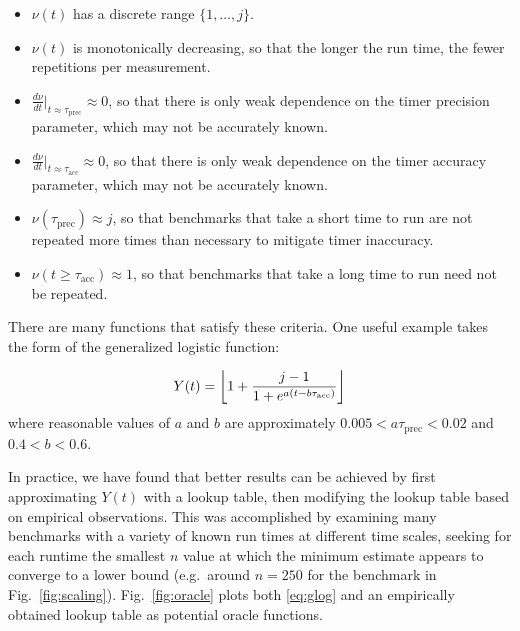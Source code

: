 \documentclass[conference]{IEEEtran}
\DeclarePairedDelimiter\floor{\lfloor}{\rfloor}
\begin{document}
\begin{itemize}
    \item $\nu(t)$ has a discrete range $\{1, \dots, j\}$.
    \item $\nu(t)$ is monotonically decreasing, so that the longer the run time, the fewer repetitions per measurement.
    \item $\frac{d\nu}{dt}|_{t \approx \tau_{\textrm{prec}}} \approx 0$,
    so that there is only weak dependence on the timer precision parameter,
    which may not be accurately known.
    \item $\frac{d\nu}{dt}|_{t \approx \tau_{\textrm{acc}}} \approx 0$,
    so that there is only weak dependence on the timer accuracy parameter,
    which may not be accurately known.
    \item $\nu(\tau_{\textrm{prec}}) \approx j$, so that benchmarks that take a     short time to run are not repeated more times than necessary to mitigate timer inaccuracy.
    \item $\nu(t \ge \tau_{\textrm{acc}}) \approx 1$, so that benchmarks that take a long time to run need not be repeated.
\end{itemize}

There are many functions that satisfy these criteria. One useful example takes
the form of the generalized logistic function:

\begin{equation}
\label{eq:glog}
    Y(t) = \floor*{1 + \frac{j - 1}{1 + e^{a (t - b \tau_{\textrm{acc}})}}}
\end{equation}
%
where reasonable values of $a$ and $b$ are approximately $0.005 < a \tau_{\textrm{prec}} < 0.02$ and $0.4 < b <
0.6$.

In practice, we have found that better results can be achieved by first
approximating $Y(t)$ with a lookup table, then modifying the lookup table based
on empirical observations. This was accomplished by examining many benchmarks
with a variety of known run times at different time scales, seeking for each
runtime the smallest $n$ value at which the minimum estimate appears to
converge to a lower bound (e.g.\ around $n = 250$ for the benchmark in
Fig.~\ref{fig:scaling}). Fig.~\ref{fig:oracle} plots both \eqref{eq:glog} and an
empirically obtained lookup table as potential oracle functions.
\end{document}
